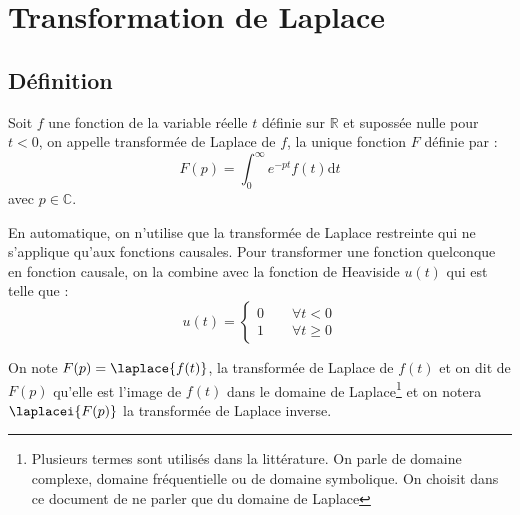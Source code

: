 \chapter{Transformation de Laplace\label{annexe-lap}}
\section{Définition} 
Soit $f$ une fonction de la variable réelle $t$ définie sur $\mathbb{R}$ 
et supossée  nulle pour $t<0$, on appelle transformée de Laplace de $f$, 
la unique fonction $F$ définie par :
\[
F(p) = \int_0^\infty e^{-pt} f(t) \mathrm{d}t
\]
avec $p\in\mathbb{C}$. 

En automatique, on n'utilise que la transformée de Laplace restreinte qui 
ne s'applique qu'aux fonctions causales.
Pour transformer une fonction quelconque en fonction causale, 
on la combine avec la fonction de Heaviside $u(t)$ qui est telle que :
\[
    u(t)=\begin{cases}0\qquad\forall t<0\\1 \qquad\forall t\geq 0\end{cases}
\]

On note $F(p)=\laplace{f(t)}$, la transformée de Laplace de $f(t)$ et on dit 
de $F(p)$ qu'elle est l'image de $f(t)$ dans le domaine de 
Laplace\footnote{Plusieurs termes sont utilisés dans la littérature. On parle 
de domaine complexe, domaine fréquentielle ou de domaine symbolique. On choisit 
dans ce document de ne parler que du domaine de Laplace} et on notera 
$\laplacei{F(p)}$ la transformée de Laplace inverse.

